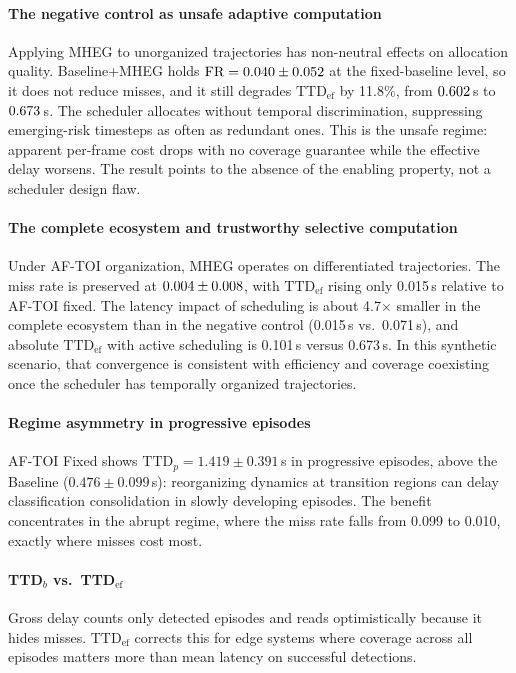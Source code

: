 \documentclass[a4paper,fleqn]{cas-dc}
\newcommand{\AFTOI}{\mbox{AF-TOI}\xspace}
\newcommand{\MHEG}{\mbox{MHEG}\xspace}
\begin{document}
\paragraph{The negative control as unsafe adaptive computation}
Applying \MHEG to unorganized trajectories has non-neutral effects on allocation
quality. Baseline+MHEG holds $\text{FR} = 0.040 \pm 0.052$
at the fixed-baseline level, so it does not reduce misses, and it still degrades
$\mathrm{TTD}_{\mathrm{ef}}$ by 11.8\%, from $0.602$\,s to
$0.673$\,s. The scheduler allocates without temporal discrimination,
suppressing emerging-risk timesteps as often as redundant ones. This is the
unsafe regime: apparent per-frame cost drops with no coverage guarantee while
the effective delay worsens. The result points to the absence of the enabling
property, not a scheduler design flaw.
\paragraph{The complete ecosystem and trustworthy selective computation}
Under \AFTOI organization, \MHEG operates on differentiated trajectories. The
miss rate is preserved at $0.004 \pm 0.008$, with
$\mathrm{TTD}_{\mathrm{ef}}$ rising only 0.015\,s relative to \AFTOI fixed. The
latency impact of scheduling is about 4.7$\times$ smaller in the complete
ecosystem than in the negative control (0.015\,s vs.\ 0.071\,s), and absolute
$\mathrm{TTD}_{\mathrm{ef}}$ with active scheduling is 0.101\,s versus 0.673\,s.
In this synthetic scenario, that convergence is consistent with efficiency and
coverage coexisting once the scheduler has temporally organized trajectories.
\paragraph{Regime asymmetry in progressive episodes}
\AFTOI Fixed shows $\text{TTD}_p = 1.419 \pm 0.391$\,s in progressive episodes,
above the Baseline ($0.476 \pm 0.099$\,s): reorganizing dynamics at transition
regions can delay classification consolidation in slowly developing episodes.
The benefit concentrates in the abrupt regime, where the miss rate falls from
0.099 to 0.010, exactly where misses cost most.
\paragraph{TTD$_b$ vs.\ TTD$_{\mathrm{ef}}$}
Gross delay counts only detected episodes and reads optimistically because it
hides misses. $\mathrm{TTD}_{\mathrm{ef}}$ corrects this for edge systems where
coverage across all episodes matters more than mean latency on successful
detections.
\end{document}
